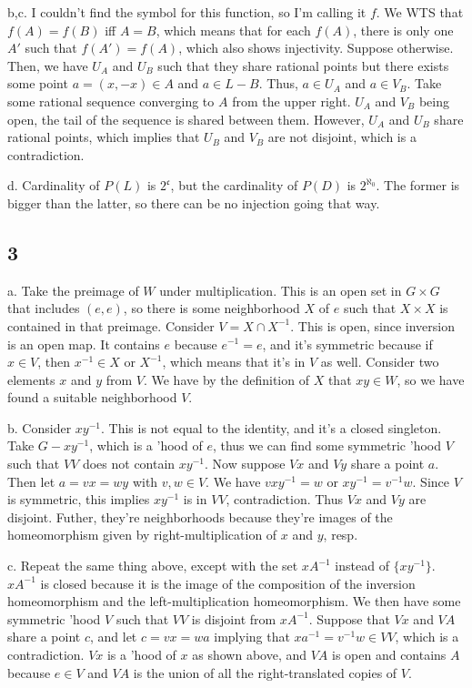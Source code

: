 \documentclass{article}
\begin{document}
b,c. I couldn't find the symbol for this function, so I'm calling it $f$. We WTS that $f(A)=f(B)$ iff $A=B$, which means that for each $f(A)$, there is only one $A'$ such that $f(A')=f(A)$, which also shows injectivity. Suppose otherwise. Then, we have $U_A$ and $U_B$ such that they share rational points but there exists some point $a=(x,-x)\in A$ and $a\in L-B$. Thus, $a\in U_A$ and $a\in V_B$. Take some rational sequence converging to $A$ from the upper right. $U_A$ and $V_B$ being open, the tail of the sequence is shared between them. However, $U_A$ and $U_B$ share rational points, which implies that $U_B$ and $V_B$ are not disjoint, which is a contradiction. 

d. Cardinality of $P(L)$ is $2^\mathfrak{c}$, but the cardinality of $P(D)$ is $2^{\aleph_0}$. The former is bigger than the latter, so there can be no injection going that way.

\subsection*{3}
a. Take the preimage of $W$ under multiplication. This is an open set in $G\times G$ that includes $(e,e)$, so there is some neighborhood $X$ of $e$ such that $X\times X$ is contained in that preimage. Consider $V=X\cap X^{-1}$. This is open, since inversion is an open map. It contains $e$ because $e^{-1}=e$, and it's symmetric because if $x\in V$, then $x^{-1}\in X$ or $X^{-1}$, which means that it's in $V$ as well. Consider two elements $x$ and $y$ from $V$. We have by the definition of $X$ that $xy\in W$, so we have found a suitable neighborhood $V$.

b. Consider $xy^{-1}$. This is not equal to the identity, and it's a closed singleton. Take $G-xy^{-1}$, which is a 'hood of $e$, thus we can find some symmetric 'hood $V$ such that $VV$ does not contain $xy^{-1}$. Now suppose $Vx$ and $Vy$ share a point $a$. Then let $a=vx=wy$ with $v,w\in V$. We have $vxy^{-1}=w$ or $xy^{-1}=v^{-1}w$. Since $V$ is symmetric, this implies $xy^{-1}$ is in $VV$, contradiction. Thus $Vx$ and $Vy$ are disjoint. Futher, they're neighborhoods because they're images of the homeomorphism given by right-multiplication of $x$ and $y$, resp.

c. Repeat the same thing above, except with the set $xA^{-1}$ instead of $\{xy^{-1}\}$. $xA^{-1}$ is closed because it is the image of the composition of the inversion homeomorphism and the left-multiplication homeomorphism. We then have some symmetric 'hood $V$ such that $VV$ is disjoint from $xA^{-1}$. Suppose that $Vx$ and $VA$ share a point $c$, and let $c=vx=wa$ implying that $xa^{-1}=v^{-1}w\in VV$, which is a contradiction. $Vx$ is a 'hood of $x$ as shown above, and $VA$ is open and contains $A$ because $e\in V$ and $VA$ is the union of all the right-translated copies of $V$.
\end{document}
